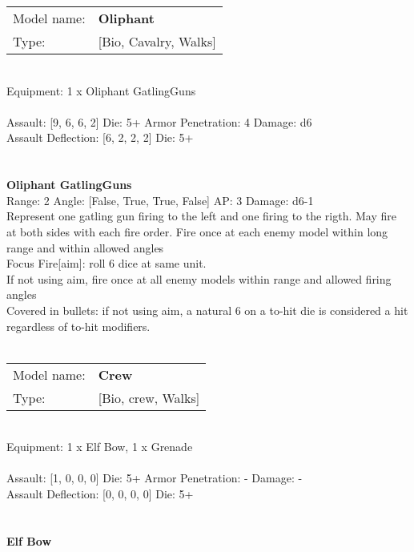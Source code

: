 \begin{tabular}{ll}
Model name: & {\bf Oliphant } \\
Type: & [Bio, Cavalry, Walks] \\
\end{tabular}
\ \\
Equipment: 1 x Oliphant GatlingGuns \\
\ \\
Assault: [9, 6, 6, 2] Die: 5+ Armor Penetration: 4 Damage: d6 \\
Assault Deflection: [6, 2, 2, 2] Die: 5+\\
\indent  
\ \\

\ \\
{\bf Oliphant GatlingGuns } \\



Range: 2  Angle: [False, True, True, False] AP: 3 Damage: d6-1 \\
Represent one gatling gun firing to the left and one firing to the rigth. May fire at both sides with each fire order. Fire once at each enemy model within long range and within allowed angles\\ 
Focus Fire[aim]: roll 6 dice at same unit.\\ 
If not using aim, fire once at all enemy models within range and allowed firing angles\\ 
Covered in bullets: if not using aim, a natural 6 on a to-hit die is considered a hit regardless of to-hit modifiers.\\ 




 
\ \\


\begin{tabular}{ll}
Model name: & {\bf Crew } \\
Type: & [Bio, crew, Walks] \\
\end{tabular}
\ \\
Equipment: 1 x Elf Bow, 1 x Grenade \\
\ \\
Assault: [1, 0, 0, 0] Die: 5+ Armor Penetration: - Damage: - \\
Assault Deflection: [0, 0, 0, 0] Die: 5+\\
\indent  
\ \\

\ \\
{\bf Elf Bow } \\



